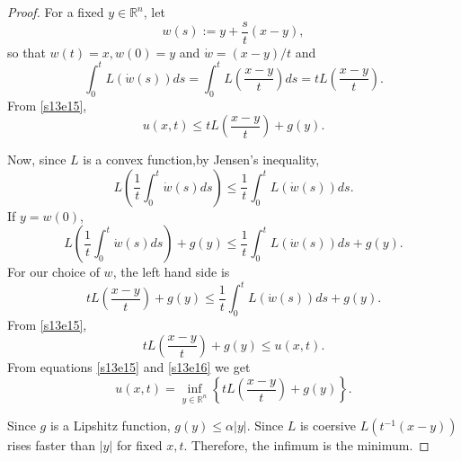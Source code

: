 \documentclass{article}
\theoremstyle{plain}
\numberwithin{thm}{section}
\theoremstyle{plain}
\numberwithin{prop}{section}
\theoremstyle{definition}
\numberwithin{defn}{section}
\theoremstyle{remark}
\numberwithin{equation}{section}
\begin{document}
\begin{proof}
For a fixed $y \in \mathbb{R}^n$, let 
\[
w(s) := y + \frac{s}{t}(x - y),
\]
so that $w(t) = x, w(0) = y$ and $\dot{w} = (x - y)/t$ and 
\[
\int_0^t L(\dot{w}(s))ds = \int_0^t L\left(\frac{x - y}{t}\right)ds = tL\left(\frac{x - y}{t}\right).
\]
From \eqref{s13e15},
\begin{equation}\label{s13e16}
u(x, t) \le tL\left(\frac{x - y}{t}\right) + g(y).
\end{equation}

Now, since $L$ is a convex function,by Jensen's inequality,
\[
L\left(\frac{1}{t}\int_0^t \dot{w}(s)ds\right) \le \frac{1}{t}\int_0^t L(\dot{w}(s))ds.
\]
If $y = w(0)$,
\[
L\left(\frac{1}{t}\int_0^t \dot{w}(s)ds\right) + g(y) \le \frac{1}{t}\int_0^t L(\dot{w}(s))ds + g(y).
\]
For our choice of $w$, the left hand side is
\[
tL\left(\frac{x - y}{t}\right) + g(y) \le \frac{1}{t}\int_0^t L(\dot{w}(s))ds + g(y).
\]
From \eqref{s13e15},
\begin{equation}\label{s13e17}
tL\left(\frac{x - y}{t}\right) + g(y) \le u(x, t).
\end{equation}
From equations \eqref{s13e15} and \eqref{s13e16} we get
\[
u(x, t) = \inf_{y \in \mathbb{R}^n}\left\{tL\left(\frac{x - y}{t}\right) + g(y)\right\}.
\]

\noindent Since $g$ is a Lipshitz function, $g(y) \le \alpha |y|$. Since $L$ is coersive $L(t^{-1}(x - y))$
rises faster than $|y|$ for fixed $x, t$. Therefore, the infimum is the minimum.
\end{proof}
\end{document}
